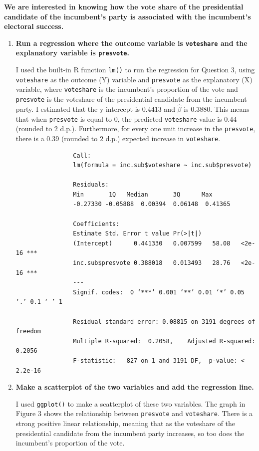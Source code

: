 \documentclass[12pt,letterpaper]{article}
\begin{document}
\noindent \textbf{We are interested in knowing how the vote share of the presidential candidate of the incumbent's party is associated with the incumbent's electoral success.}
	\vspace{.25cm}
	\begin{enumerate}
		\item \textbf{Run a regression where the outcome variable is \texttt{voteshare} and the explanatory variable is \texttt{presvote}.}
			\vspace{0cm}
			
			I used the built-in R function \texttt{lm()} to run the regression for Question $3$, using \texttt{voteshare} as the outcome (Y) variable and \texttt{presvote} as the explanatory (X) variable, where \texttt{voteshare} is the incumbent's proportion of the vote and \texttt{presvote} is the voteshare of the presidential candidate from the incumbent party. I estimated that the y-intercept is $0.4413$ and $\hat{\beta}$ is $0.3880$. This means that when \texttt{presvote} is equal to 0, the predicted \texttt{voteshare} value is $0.44$ (rounded to $2$ d.p.). Furthermore, for every one unit increase in the \texttt{presvote}, there is a $0.39$ (rounded to $2$ d.p.) expected increase in \texttt{voteshare}.
			
			 
			
			\begin{verbatim}
				Call:
				lm(formula = inc.sub$voteshare ~ inc.sub$presvote)
				
				Residuals:
				Min       1Q   Median       3Q      Max 
				-0.27330 -0.05888  0.00394  0.06148  0.41365 
				
				Coefficients:
				Estimate Std. Error t value Pr(>|t|)    
				(Intercept)      0.441330   0.007599   58.08   <2e-16 ***
				inc.sub$presvote 0.388018   0.013493   28.76   <2e-16 ***
				---
				Signif. codes:  0 ‘***’ 0.001 ‘**’ 0.01 ‘*’ 0.05 ‘.’ 0.1 ‘ ’ 1
				
				Residual standard error: 0.08815 on 3191 degrees of freedom
				Multiple R-squared:  0.2058,	Adjusted R-squared:  0.2056 
				F-statistic:   827 on 1 and 3191 DF,  p-value: < 2.2e-16
			\end{verbatim}
			
		\item \textbf{Make a scatterplot of the two variables and add the regression line.} 
			\vspace{0cm}
			
			I used \texttt{ggplot()} to make a scatterplot of these two variables. The graph in Figure $3$ shows the relationship between \texttt{presvote} and \texttt{voteshare}. There is a strong positive linear relationship, meaning that as the voteshare of the presidential candidate from the incumbent party increases, so too does the incumbent's proportion of the vote.
			

\end{enumerate}
\end{document}
